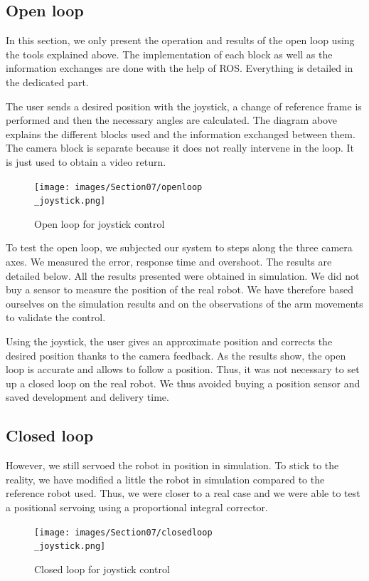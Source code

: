\subsection{Open loop}

In this section, we only present the operation and results of the open loop using the tools explained above. The implementation of each block as well as the information exchanges are done with the help of ROS. Everything is detailed in the dedicated part.

\bigbreak
The user sends a desired position with the joystick, a change of reference frame is performed and then the necessary angles are calculated. The diagram above explains the different blocks used and the information exchanged between them. The camera block is separate because it does not really intervene in the loop. It is just used to obtain a video return.
\begin{figure}[ht]
    \centering
    \texttt{[image: images/Section07/openloop\\\_joystick.png]}
    \caption{Open loop for joystick control}
    \label{fig:mesh19}
\end{figure}
\FloatBarrier

\bigbreak 
To test the open loop, we subjected our system to steps along the three camera axes. We measured the error, response time and overshoot. The results are detailed below. All the results presented were obtained in simulation. We did not buy a sensor to measure the position of the real robot. We have therefore based ourselves on the simulation results and on the observations of the arm movements to validate the control.

\bigbreak
Using the joystick, the user gives an approximate position and corrects the desired position thanks to the camera feedback. As the results show, the open loop is accurate and allows to follow a position. Thus, it was not necessary to set up a closed loop on the real robot. We thus avoided buying a position sensor and saved development and delivery time.

\subsection{Closed loop}


However, we still servoed the robot in position in simulation. To stick to the reality, we have modified a little the robot in simulation compared to the reference robot used. Thus, we were closer to a real case and we were able to test a positional servoing using a proportional integral corrector.

\begin{figure}[ht]
    \centering
    \texttt{[image: images/Section07/closedloop\\\_joystick.png]}
    \caption{Closed loop for joystick control}
    \label{fig:mesh20}
\end{figure}
\FloatBarrier